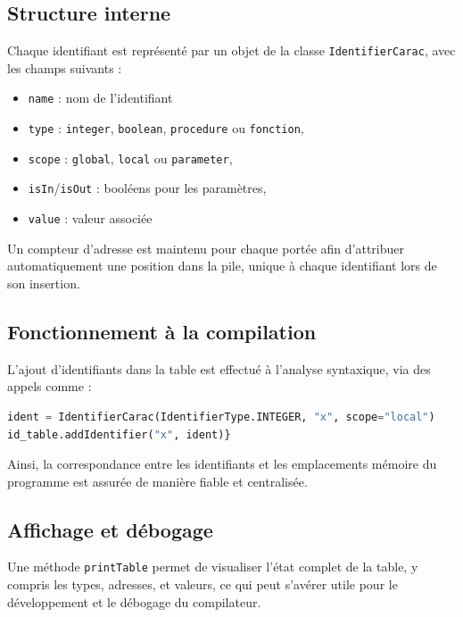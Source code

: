 \documentclass[a4paper, 12pt]{article}
\begin{document}
    \subsection{Structure interne}
    Chaque identifiant est représenté par un objet de la classe \texttt{IdentifierCarac}, avec les champs suivants : 
    \begin{itemize}
        \item \texttt{name} : nom de l'identifiant 
        \item \texttt{type} : \texttt{integer}, \texttt{boolean}, \texttt{procedure} ou \texttt{fonction},
        \item \texttt{scope} : \texttt{global}, \texttt{local} ou \texttt{parameter},
        \item \texttt{isIn}/\texttt{isOut} : booléens pour les paramètres,
        \item \texttt{value} : valeur associée 
    \end{itemize}

    \vspace{12pt}
    
    Un compteur d'adresse est maintenu pour chaque portée afin d'attribuer automatiquement une position dans la pile, unique à chaque identifiant lors de son insertion. 

    \subsection{Fonctionnement à la compilation}

    L'ajout d'identifiants dans la table est effectué à l'analyse syntaxique, via des appels comme :
    \begin{lstlisting}[language=python, xleftmargin=20pt]
ident = IdentifierCarac(IdentifierType.INTEGER, "x", scope="local")
id_table.addIdentifier("x", ident)} \end{lstlisting}

    Ainsi, la correspondance entre les identifiants et les emplacements mémoire du programme est assurée de manière fiable et centralisée. 

    \subsection{Affichage et débogage}

    Une méthode \texttt{printTable} permet de visualiser l'état complet de la table, y compris les types, adresses, et valeurs, ce qui peut s'avérer utile pour le développement et le débogage du compilateur.
\end{document}
